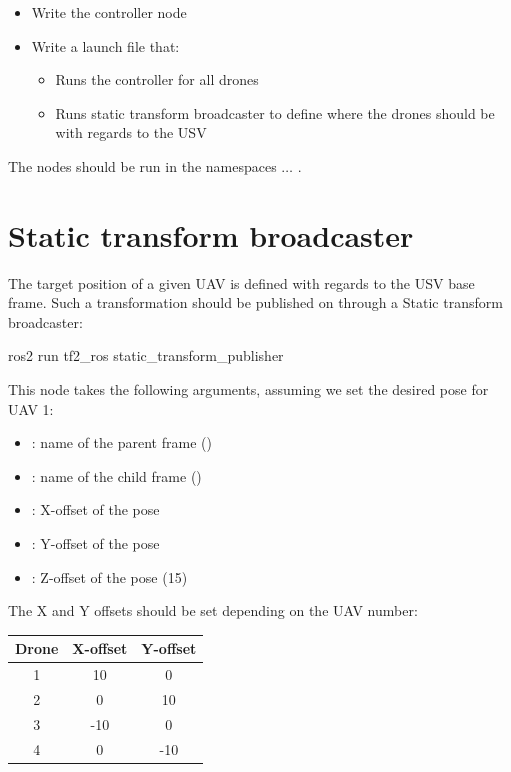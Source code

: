 \documentclass{ecnreport}
\begin{document}
\begin{itemize}
 \item Write the controller node
 \item Write a launch file that:
 \begin{itemize}
  \item Runs the controller for all drones
  \item Runs static transform broadcaster to define where the drones should be with regards to the USV
 \end{itemize}
\end{itemize}

The nodes should be run in the namespaces  $\hdots$ .

\section{Static transform broadcaster}

The target position of a given UAV is defined with regards to the USV base frame. Such a transformation should be published on  through a Static transform broadcaster:
\begin{bashcodelarge}
 ros2 run tf2_ros static_transform_publisher
\end{bashcodelarge}
This node takes the following arguments, assuming we set the desired pose for UAV 1:
\begin{itemize}
 \item {}: name of the parent frame ()
 \item {}: name of the child frame ()
 \item {}: X-offset of the pose
 \item {}: Y-offset of the pose
 \item {}: Z-offset of the pose (15)
\end{itemize}

The X and Y offsets should be set depending on the UAV number:
 \begin{table}[h]\centering
  \begin{tabular}{|c|c|c|}\hline
   Drone & X-offset & Y-offset \\\hline
   1 & 10 & 0 \\\hline
   2& 0 &10 \\\hline
   3 & -10 & 0 \\\hline
   4 & 0 & -10 \\\hline
  \end{tabular}
 \end{table}
\end{document}
